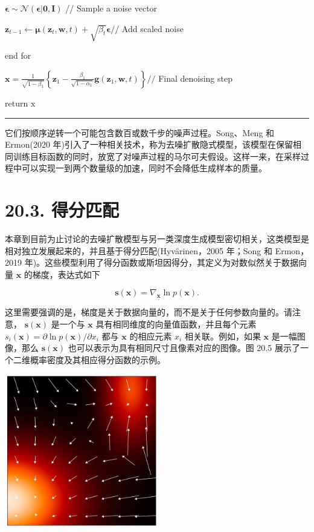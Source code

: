 \documentclass[10pt]{article}
\newcommand{\HRule}{\begin{center}\rule{0.9\linewidth}{0.2mm}\end{center}}
\begin{document}
\hspace*{1em} \(\mathbf{\epsilon } \sim  \mathcal{N}\left( {\mathbf{\epsilon }|\mathbf{0},\mathbf{I}}\right)\) // Sample a noise vector

\hspace*{1em} \({\mathbf{z}}_{t - 1} \leftarrow  \mathbf{\mu }\left( {{\mathbf{z}}_{t},\mathbf{w},t}\right)  + \sqrt{{\beta }_{t}}\mathbf{\epsilon }//\) Add scaled noise

end for

\(\mathbf{x} = \frac{1}{\sqrt{1 - {\beta }_{1}}}\left\{  {{\mathbf{z}}_{1} - \frac{{\beta }_{1}}{\sqrt{1 - {\alpha }_{1}}}\mathbf{g}\left( {{\mathbf{z}}_{1},\mathbf{w},t}\right) }\right\}  //\) Final denoising step

return \(\mathrm{x}\)

\HRule

它们按顺序逆转一个可能包含数百或数千步的噪声过程。Song、Meng 和 Ermon(2020 年)引入了一种相关技术，称为去噪扩散隐式模型，该模型在保留相同训练目标函数的同时，放宽了对噪声过程的马尔可夫假设。这样一来，在采样过程中可以实现一到两个数量级的加速，同时不会降低生成样本的质量。

\section*{20.3. 得分匹配}

本章到目前为止讨论的去噪扩散模型与另一类深度生成模型密切相关，这类模型是相对独立发展起来的，并且基于得分匹配(Hyvärinen，2005 年；Song 和 Ermon，2019 年)。这些模型利用了得分函数或斯坦因得分，其定义为对数似然关于数据向量 \(\mathbf{x}\) 的梯度，表达式如下

\[
\mathbf{s}\left( \mathbf{x}\right)  = {\nabla }_{\mathbf{x}}\ln p\left( \mathbf{x}\right) . \tag{20.42}
\]

这里需要强调的是，梯度是关于数据向量的，而不是关于任何参数向量的。请注意， \(\mathbf{s}\left( \mathbf{x}\right)\) 是一个与 \(\mathbf{x}\) 具有相同维度的向量值函数，并且每个元素 \({s}_{i}\left( \mathbf{x}\right)  = \partial \ln p\left( \mathbf{x}\right) /\partial {x}_{i}\) 都与 \(\mathbf{x}\) 的相应元素 \({x}_{i}\) 相关联。例如，如果 \(\mathbf{x}\) 是一幅图像，那么 \(\mathbf{s}\left( \mathbf{x}\right)\) 也可以表示为具有相同尺寸且像素对应的图像。图 20.5 展示了一个二维概率密度及其相应得分函数的示例。

\begin{center}
\includegraphics[max width=0.5\textwidth]{images/0194e279-9b28-703a-88f4-c3ac21e2010d_614_910_349_624_626_0.jpg}
\end{center}
\hspace*{3em} 
\end{document}
